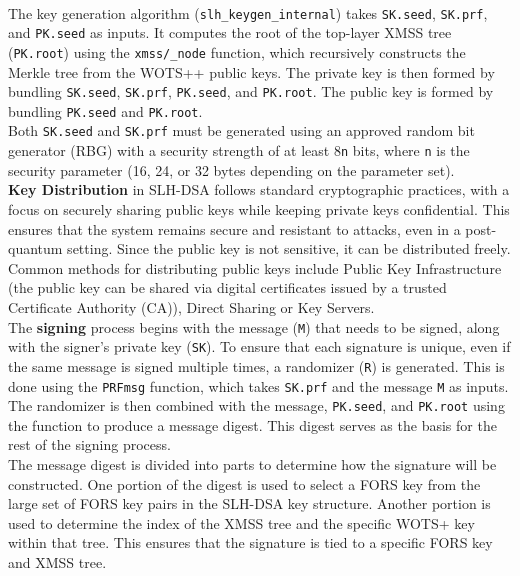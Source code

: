 \documentclass[journal=tosc,notanonymous]{iacrtrans}
\begin{document}
\\
The key generation algorithm (\verb|slh_keygen_internal|) takes \texttt{SK.seed}, \texttt{SK.prf}, and \texttt{PK.seed} as inputs.
It computes the root of the top-layer XMSS tree (\texttt{PK.root}) using the \verb|xmss/_node| function, which recursively constructs the Merkle tree from the WOTS++ public keys.
The private key is then formed by bundling \texttt{SK.seed}, \texttt{SK.prf}, \texttt{PK.seed}, and \texttt{PK.root}.
The public key is formed by bundling \texttt{PK.seed} and \texttt{PK.root}.
\\
Both \texttt{SK.seed} and \texttt{SK.prf} must be generated using an approved random bit generator (RBG) with a security strength of at least 8\texttt{n} bits, where \texttt{n} is the security parameter (16, 24, or 32 bytes depending on the parameter set).\\
\newline
\textbf{Key Distribution} in SLH-DSA follows standard cryptographic practices, with a focus on securely sharing public keys while keeping private keys confidential. This ensures that the system remains secure and resistant to attacks, even in a post-quantum setting. Since the public key is not sensitive, it can be distributed freely. Common methods for distributing public keys include Public Key Infrastructure (the public key can be shared via digital certificates issued by a trusted Certificate Authority (CA)), Direct Sharing or Key Servers.\\
\newline
The \textbf{signing} process begins with the message (\texttt{M}) that needs to be signed, along with the signer's private key (\texttt{SK}). 
To ensure that each signature is unique, even if the same message is signed multiple times, a randomizer (\texttt{R}) is generated. This is done using the \texttt{PRFmsg} function, which takes \texttt{SK.prf} and the message \texttt{M} as inputs. The randomizer is then combined with the message, \texttt{PK.seed}, and \texttt{PK.root} using the \texttt{} function to produce a message digest. This digest serves as the basis for the rest of the signing process.\\
The message digest is divided into parts to determine how the signature will be constructed. One portion of the digest is used to select a FORS key from the large set of FORS key pairs in the SLH-DSA key structure. Another portion is used to determine the index of the XMSS tree and the specific WOTS+ key within that tree. This ensures that the signature is tied to a specific FORS key and XMSS tree.\\
\end{document}
